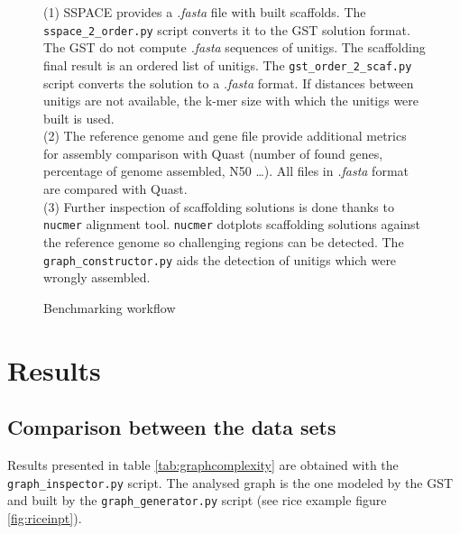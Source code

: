 \documentclass[12pt]{article}
\begin{document}
\begin{figure}[h!]
\begin{center}
{
}
\end{center}
\caption{Benchmarking workflow}
\label{fig:benchwork}
\footnotesize (1) SSPACE provides a \textit{.fasta} file with built scaffolds. The \texttt{sspace\_2\_order.py} script converts it to the GST solution format. The GST do not compute \textit{.fasta} sequences of unitigs. The scaffolding final result is an ordered list of unitigs. The \texttt{gst\_order\_2\_scaf.py} script converts the solution to a \textit{.fasta} format. If distances between unitigs are not available, the k-mer size with which the unitigs were built is used. \\
\footnotesize (2) The reference genome and gene file provide additional metrics for assembly comparison with Quast (number of found genes, percentage of genome assembled, N50 \ldots). All files in \textit{.fasta} format are compared with Quast. \\
\footnotesize (3) Further inspection of scaffolding solutions is done thanks to \texttt{nucmer} alignment tool. \texttt{nucmer} dotplots scaffolding solutions against the reference genome so challenging regions can be detected. The \texttt{graph\_constructor.py} aids the detection of unitigs which were wrongly assembled.
\end{figure}

\clearpage
\section{Results}\label{sec:res}
\subsection{Comparison between the data sets}
Results presented in table \ref{tab:graphcomplexity} are obtained with the \texttt{graph\_inspector.py} script. The analysed graph is the one modeled by the GST and built by the \texttt{graph\_generator.py} script (see rice example figure \ref{fig:riceinpt}). 
\end{document}
